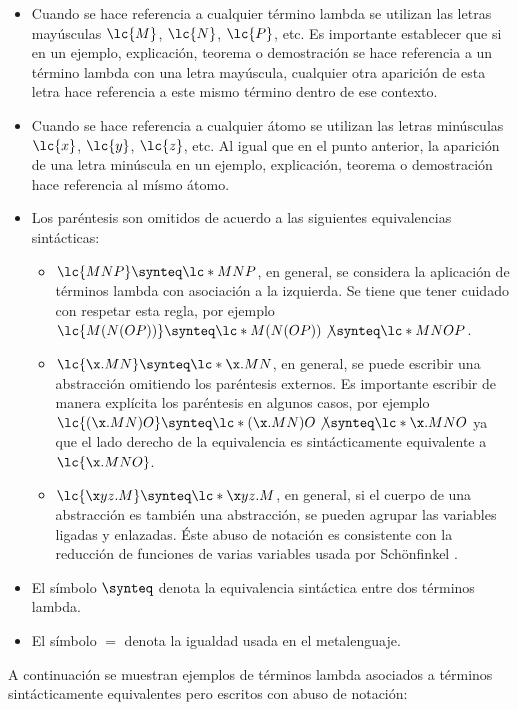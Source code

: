 \begin{itemize}
\item Cuando se hace referencia a cualquier término lambda se utilizan las
  letras mayúsculas \(\lc{M}\), \(\lc{N}\), \(\lc{P}\), etc. Es importante
  establecer que si en un ejemplo, explicación, teorema o demostración se hace
  referencia a un término lambda con una letra mayúscula, cualquier otra
  aparición de esta letra hace referencia a este mismo término dentro de ese
  contexto.
\item Cuando se hace referencia a cualquier átomo se utilizan las letras
  minúsculas \(\lc{x}\), \(\lc{y}\), \(\lc{z}\), etc. Al igual que en el punto
  anterior, la aparición de una letra minúscula en un ejemplo, explicación,
  teorema o demostración hace referencia al mísmo átomo.
\item Los paréntesis son omitidos de acuerdo a las siguientes equivalencias
  sintácticas:
  \begin{itemize}
  \item \(\lc{M N P} \synteq \lc*{M N P}\), en general, se considera la
    aplicación de términos lambda con asociación a la izquierda. Se tiene que
    tener cuidado con respetar esta regla, por ejemplo \(\lc{M(N(O
      P))} \synteq \lc*{M(N(O P))} \not\synteq \lc*{M N O P}\).
  \item \(\lc{\x.M N} \synteq \lc*{\x.M N}\), en general, se puede escribir una
    abstracción omitiendo los paréntesis externos. Es importante escribir de
    manera explícita los paréntesis en algunos casos, por ejemplo \(\lc{(\x.M N) O} \synteq
    \lc*{(\x.M N) O} \not\synteq \lc*{\x.M N O}\) ya que el lado derecho de la
    equivalencia es sintácticamente equivalente a \(\lc{\x.M N O}\).
  \item \(\lc{\x y z.M} \synteq \lc*{\x y z.M}\), en general, si el cuerpo de
    una abstracción es también una abstracción, se pueden agrupar las variables
    ligadas y enlazadas. Éste abuso de notación es consistente con la reducción
    de funciones de varias variables usada por Schönfinkel \cite{Schonfinkel:Varargs}.
  \end{itemize}
\item El símbolo \(\synteq\) denota la equivalencia sintáctica entre dos
  términos lambda.
\item El símbolo \(=\) denota la igualdad usada en el metalenguaje.
\end{itemize}

A continuación se muestran ejemplos de términos lambda asociados a términos
sintácticamente equivalentes pero escritos con abuso de notación:

